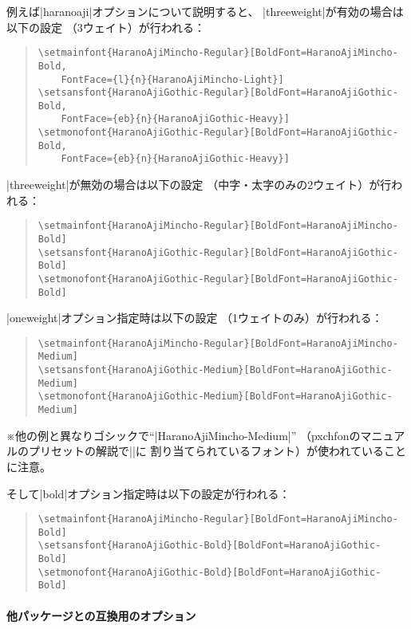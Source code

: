 \documentclass[xelatex,ja=standard,jafont=ipaex,
  a4paper]{bxjsarticle}
\newcommand{\Pkg}[1]{\textsf{#1}}
\newcommand{\Note}{\par\noindent ※}
\begin{document}
例えば\>|haranoaji|\>オプションについて説明すると、%
|threeweight|\>が有効の場合は以下の設定
（3ウェイト）が行われる：
\begin{quote}\small\begin{verbatim}
\setmainfont{HaranoAjiMincho-Regular}[BoldFont=HaranoAjiMincho-Bold,
    FontFace={l}{n}{HaranoAjiMincho-Light}]
\setsansfont{HaranoAjiGothic-Regular}[BoldFont=HaranoAjiGothic-Bold,
    FontFace={eb}{n}{HaranoAjiGothic-Heavy}]
\setmonofont{HaranoAjiGothic-Regular}[BoldFont=HaranoAjiGothic-Bold,
    FontFace={eb}{n}{HaranoAjiGothic-Heavy}]
\end{verbatim}\end{quote}

|threeweight|\>が無効の場合は以下の設定
（中字・太字のみの2ウェイト）が行われる：
\begin{quote}\small\begin{verbatim}
\setmainfont{HaranoAjiMincho-Regular}[BoldFont=HaranoAjiMincho-Bold]
\setsansfont{HaranoAjiGothic-Regular}[BoldFont=HaranoAjiGothic-Bold]
\setmonofont{HaranoAjiGothic-Regular}[BoldFont=HaranoAjiGothic-Bold]
\end{verbatim}\end{quote}

|oneweight|\>オプション指定時は以下の設定
（1ウェイトのみ）が行われる：
\begin{quote}\small\begin{verbatim}
\setmainfont{HaranoAjiMincho-Regular}[BoldFont=HaranoAjiMincho-Medium]
\setsansfont{HaranoAjiGothic-Medium}[BoldFont=HaranoAjiGothic-Medium]
\setmonofont{HaranoAjiGothic-Medium}[BoldFont=HaranoAjiGothic-Medium]
\end{verbatim}\end{quote}
\Note 他の例と異なりゴシックで“|HaranoAjiMincho-Medium|”%
（\Pkg{pxchfon}のマニュアルのプリセットの解説で\>|\setgothicfont|\>に
割り当てられているフォント）が使われていることに注意。

そして\>|bold|\>オプション指定時は以下の設定が行われる：
\begin{quote}\small\begin{verbatim}
\setmainfont{HaranoAjiMincho-Regular}[BoldFont=HaranoAjiMincho-Bold]
\setsansfont{HaranoAjiGothic-Bold}[BoldFont=HaranoAjiGothic-Bold]
\setmonofont{HaranoAjiGothic-Bold}[BoldFont=HaranoAjiGothic-Bold]
\end{verbatim}\end{quote}

\paragraph{他パッケージとの互換用のオプション}
\mbox{}
\end{document}
